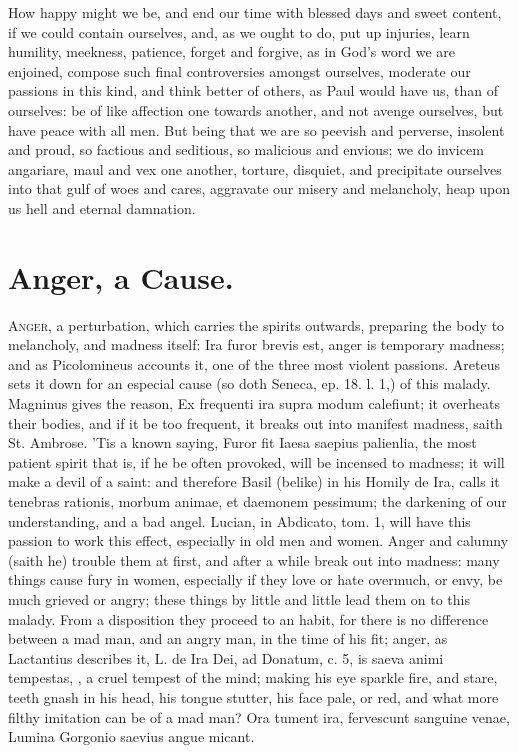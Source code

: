 {How happy might we be, and end our time with blessed days and sweet
content, if we could contain ourselves, and, as we ought to do, put up
injuries, learn humility, meekness, patience, forget and forgive, as in
God's word we are enjoined, compose such final controversies
amongst ourselves, moderate our passions in this kind, and think better
of others, as Paul would have us, than of ourselves: be of like
affection one towards another, and not avenge ourselves, but have peace
with all men. But being that we are so peevish and perverse, insolent
and proud, so factious and seditious, so malicious and envious; we do
invicem angariare, maul and vex one another, torture, disquiet, and
precipitate ourselves into that gulf of woes and cares, aggravate our
misery and melancholy, heap upon us hell and eternal damnation.

\section{Anger, a Cause.}

\lettrine{A}{nger}, a perturbation, which carries the spirits outwards, preparing
the body to melancholy, and madness itself: Ira furor brevis est, anger
is temporary madness; and as Picolomineus accounts it, one of the
three most violent passions. Areteus sets it down for an especial
cause (so doth Seneca, ep. 18. l. 1,) of this malady. Magninus
gives the reason, Ex frequenti ira supra modum calefiunt; it overheats
their bodies, and if it be too frequent, it breaks out into manifest
madness, saith St. Ambrose. 'Tis a known saying, Furor fit Iaesa
saepius palienlia, the most patient spirit that is, if he be often
provoked, will be incensed to madness; it will make a devil of a saint:
and therefore Basil (belike) in his Homily de Ira, calls it tenebras
rationis, morbum animae, et daemonem pessimum; the darkening of our
understanding, and a bad angel. Lucian, in Abdicato, tom. 1, will
have this passion to work this effect, especially in old men and women.
Anger and calumny (saith he) trouble them at first, and after a while
break out into madness: many things cause fury in women, especially if
they love or hate overmuch, or envy, be much grieved or angry; these
things by little and little lead them on to this malady. From a
disposition they proceed to an habit, for there is no difference
between a mad man, and an angry man, in the time of his fit; anger, as
Lactantius describes it, L. de Ira Dei, ad Donatum, c. 5, is
saeva animi tempestas, \etc{}, a cruel tempest of the mind; making
his eye sparkle fire, and stare, teeth gnash in his head, his tongue
stutter, his face pale, or red, and what more filthy imitation can be
of a mad man?
Ora tument ira, fervescunt sanguine venae,
Lumina Gorgonio saevius angue micant.

}
